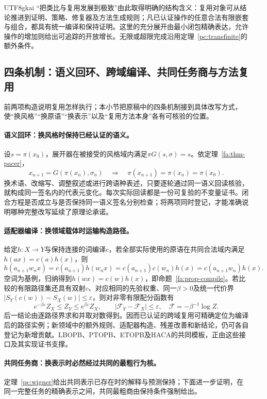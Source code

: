 \documentclass[11pt,a4paper]{article}
\theoremstyle{plain}
\theoremstyle{definition}
\theoremstyle{remark}
\begin{document}
\begin{CJK*}{UTF8}{gkai}
“把类比与复用发展到极致”由此取得明确的结构含义：复用对象可从结论推进到证明、策略、修复器及方法生成规则；凡已认证操作的任意合法有限嵌套与组合，都具有统一编译和保持证明。这里的充分展开由最小闭包精确表达，允许操作的增加则给出可追踪的开放增长。无限或超限完成沿用定理~\ref{pc:transfinite}的额外条件。

\subsection{四条机制：语义回环、跨域编译、共同任务商与方法复用}
\label{ar:four-mechanisms}

前两项构造说明复用怎样执行；本小节把原稿中的四条机制接到具体改写方式，使“换风格”“换原语”“换表示”以及“复用方法本身”各有可核验的位置。

\paragraph{语义回环：换风格时保持已经认证的语义。}
设$s=\pi(x_0)$，展开器在被接受的风格域内满足$\pi G(s,\sigma)=s$。依定理~\ref{fa:thm-pacer}，
\[
 x_{n+1}=G(\pi(x_n),\sigma_n)
 \quad\Longrightarrow\quad
 \pi(x_{n+1})=\pi(x_n)=\pi(x_0).
\]
换术语、改缩写、调整叙述或进行跨语种表述，只要逐轮通过同一语义回读核验，就构成同一签名内的代表元变化。每次实际回读都是一份可复验的不变量证书。闭合方程是否成立与是否保持同一语义签名分别检查；将两项同时登记，才能准确说明哪种完整改写延续了原理论承诺。\cite{S12}

\paragraph{适配器编译：换领域载体时运输构造路径。}
给定$h:X\to Y$与保持连接的词编译$c$，若全部实际使用的原语在共同合法域内满足$h(ax)=c(a)h(x)$，则
\[
 h(a_{n+1}w_nx)
 =c(a_{n+1})h(w_nx)
 =c(a_{n+1})c(w_n)h(x)
 =c(a_{n+1}w_n)h(x).
\]
空词为基例，归纳得到$h(wx)=c(w)h(x)$，即命题~\ref{fa:prop-compile}。若比较的有限路径集还具有双射$c$、对应相同的先验权重、同一$\beta>0$及统一代价界
$|S_Y(c(w))-S_X(w)|\le\varepsilon$，则对非零有限配分函数有
\[
 e^{-\beta\varepsilon}Z_X\le Z_Y\le e^{\beta\varepsilon}Z_X,
 \qquad
 |\mathcal F_Y-\mathcal F_X|\le\varepsilon,
 \quad \mathcal F=-\beta^{-1}\log Z.
\]
后一结论由逐路径界求和并取对数得到。因而已认证的跨域复用可精确定位为编译后的路径实例；新领域中的额外规则、适配器构造、残差改善和新结论，仍可各自登记为新增贡献。LBOPB、PTOPB、ETOPB及HACA的共同模板，正由这些接口及其实现证书支撑。\cite{S04,S13,S14}

\paragraph{共同任务商：换表示时必然经过共同的最粗行为核。}
定理~\ref{pc:wigner}给出共同表示已存在时的解释与预测保持；下面进一步证明，在同一完整任务的精确表示之间，共同最粗商由保持条件强制给出。


\end{CJK*}
\end{document}
